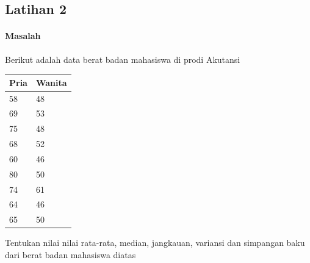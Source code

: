 \documentclass[a4paper,12pt]{article}
\begin{document}
\subsection{Latihan 2}

\paragraph{Masalah\\}
Berikut adalah data berat badan mahasiswa di prodi  Akutansi
\begin{table}[!ht]

	\begin{tabular}{|l|l|}
		\hline
		
		Pria & Wanita \\ \hline
		58 & 48 \\ \hline
		69 & 53 \\ \hline
		75 & 48 \\ \hline
		68 & 52 \\ \hline
		60 & 46 \\ \hline
		80 & 50 \\ \hline
		74 & 61 \\ \hline
		64 & 46 \\ \hline
		65 & 50 \\ \hline
		
	\end{tabular}
\end{table}
Tentukan nilai nilai rata-rata, median, jangkauan, variansi dan simpangan baku dari berat badan mahasiswa diatas

\newpage
\end{document}
